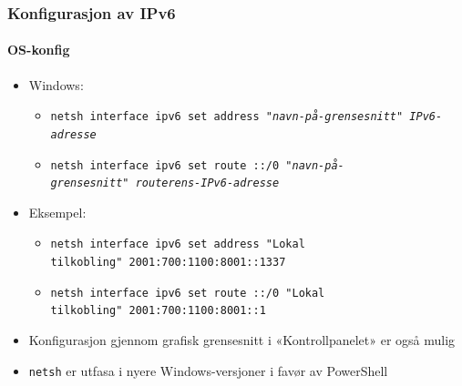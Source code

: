 \begin{frame}
  \frametitle{Konfigurasjon av IPv6}
  \framesubtitle{OS-konfig}
  \begin{itemize}
  \item Windows:
    \begin{itemize}
    \item \texttt{\footnotesize netsh interface ipv6 set address\ "\textit{navn-på-grensesnitt}"\ \textit{IPv6-adresse}}
    \item \texttt{\footnotesize netsh interface ipv6 set route ::/0\ "\textit{navn-på-grensesnitt}"\ \textit{routerens-IPv6-adresse}}
    \end{itemize}
  \item Eksempel:
    \begin{itemize}
    \item \texttt{\footnotesize netsh interface ipv6 set address\ "\texttt{Lokal tilkobling}"\ 2001:700:1100:8001::1337}
    \item \texttt{\footnotesize netsh interface ipv6 set route ::/0\ "\texttt{Lokal tilkobling}"\ 2001:700:1100:8001::1}
    \end{itemize}
  \item Konfigurasjon gjennom grafisk grensesnitt i «Kontrollpanelet» er også mulig
  \item \texttt{netsh} er utfasa i nyere Windows-versjoner i favør av
    PowerShell
  \end{itemize}
\end{frame}

